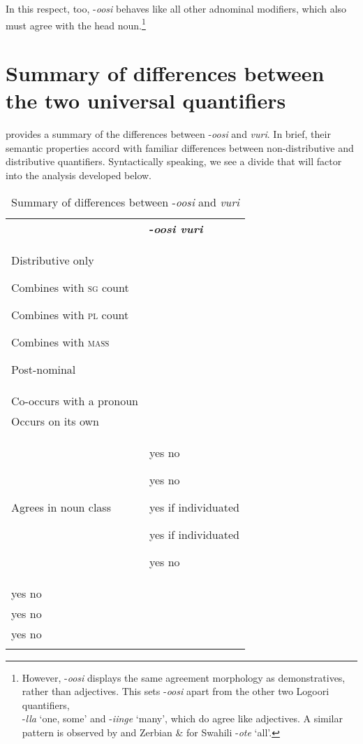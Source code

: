 \documentclass[output=paper]{langsci/langscibook}
\begin{document}
In this respect, too, -\textit{oosi} behaves like all other adnominal modifiers, which also must agree with the head noun.\footnote{ However, -\textit{oosi} displays the same agreement morphology as demonstratives, rather than adjectives. This sets -\textit{oosi} apart from the other two Logoori quantifiers, \\
{}-\textit{lla} ‘one, some’ and -\textit{iinge} ‘many’, which do agree like adjectives. A similar pattern is observed by \citet{Krifka1995} and Zerbian \& \citet{Krifka2008} for Swahili -\textit{ote} ‘all’.
} 

\section{Summary of differences between the two universal quantifiers}

 provides a summary of the differences between -\textit{oosi} and \textit{vuri}. In brief, their semantic properties accord with familiar differences between non-distributive and distributive\textit{} quantifiers. Syntactically speaking, we see a divide that will factor into the analysis developed below.

\begin{table}
\caption{Summary of differences between -\textit{oosi} and \textit{vuri}}
\label{tab:2}


\begin{tabularx}{\textwidth}{XX} & {\bfseries {}-\textit{oosi  vuri}}\\
\lsptoprule
{Distributive only}

{Combines with \textsc{sg} count}

{Combines with \textsc{pl} count}

{Combines with \textsc{mass}}

Post-nominal\\
Co-occurs with a pronoun\\
Occurs on its own\\
Agrees in noun class & yes  no 

yes  no

yes  if individuated

yes  if individuated

yes  no\\
yes  no\\
yes  no\\
yes  no  \\
\lspbottomrule
\end{tabularx}
\end{table}
\end{document}
